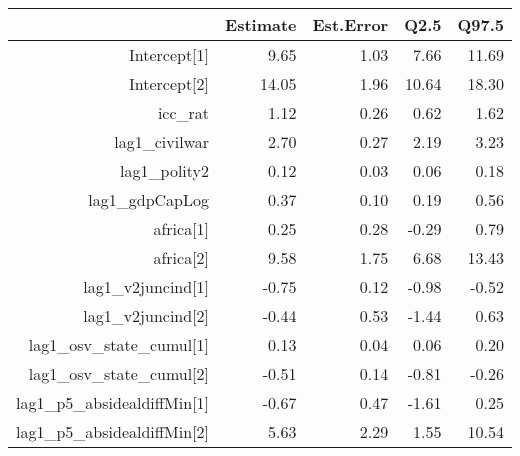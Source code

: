 \begin{table}[ht]
\centering
\begin{tabular}{rrrrr}
  \hline
 & Estimate & Est.Error & Q2.5 & Q97.5 \\ 
  \hline
Intercept[1] & 9.65 & 1.03 & 7.66 & 11.69 \\ 
  Intercept[2] & 14.05 & 1.96 & 10.64 & 18.30 \\ 
  icc\_rat & 1.12 & 0.26 & 0.62 & 1.62 \\ 
  lag1\_civilwar & 2.70 & 0.27 & 2.19 & 3.23 \\ 
  lag1\_polity2 & 0.12 & 0.03 & 0.06 & 0.18 \\ 
  lag1\_gdpCapLog & 0.37 & 0.10 & 0.19 & 0.56 \\ 
  africa[1] & 0.25 & 0.28 & -0.29 & 0.79 \\ 
  africa[2] & 9.58 & 1.75 & 6.68 & 13.43 \\ 
  lag1\_v2juncind[1] & -0.75 & 0.12 & -0.98 & -0.52 \\ 
  lag1\_v2juncind[2] & -0.44 & 0.53 & -1.44 & 0.63 \\ 
  lag1\_osv\_state\_cumul[1] & 0.13 & 0.04 & 0.06 & 0.20 \\ 
  lag1\_osv\_state\_cumul[2] & -0.51 & 0.14 & -0.81 & -0.26 \\ 
  lag1\_p5\_absidealdiffMin[1] & -0.67 & 0.47 & -1.61 & 0.25 \\ 
  lag1\_p5\_absidealdiffMin[2] & 5.63 & 2.29 & 1.55 & 10.54 \\ 
   \hline
\end{tabular}
\end{table}
